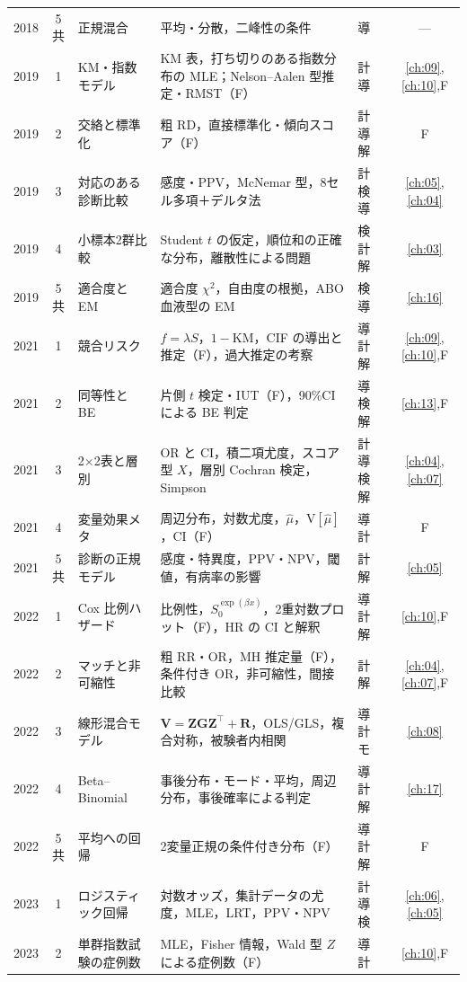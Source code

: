 \documentclass[a4paper,11pt,openany]{ltjsbook}
\newcommand{\V}{\mathrm{V}}
\newcommand{\transp}{^{\top}}
\begin{document}
\begin{center}
\begin{longtable}{@{}ccL{36mm}L{58mm}L{16mm}c@{}}
2018 & 5共 & 正規混合 & 平均・分散，二峰性の条件 & 導 & ---\\
2019 & 1 & KM・指数モデル & KM 表，打ち切りのある指数分布の MLE；Nelson--Aalen 型推定・RMST（F） & 計 導 & \ref{ch:09},\ref{ch:10},F\\
2019 & 2 & 交絡と標準化 & 粗 RD，直接標準化・傾向スコア（F） & 計 導 解 & F\\
2019 & 3 & 対応のある診断比較 & 感度・PPV，McNemar 型，8セル多項＋デルタ法 & 計 検 導 & \ref{ch:05},\ref{ch:04}\\
2019 & 4 & 小標本2群比較 & Student $t$ の仮定，順位和の正確な分布，離散性による問題 & 検 計 解 & \ref{ch:03}\\
2019 & 5共 & 適合度と EM & 適合度 $\chi^2$，自由度の根拠，ABO 血液型の EM & 検 導 & \ref{ch:16}\\
2021 & 1 & 競合リスク & $f=\lambda S$，$1-$KM，CIF の導出と推定（F），過大推定の考察 & 導 計 解 & \ref{ch:09},\ref{ch:10},F\\
2021 & 2 & 同等性と BE & 片側 $t$ 検定・IUT（F），90\%CI による BE 判定 & 導 検 解 & \ref{ch:13},F\\
2021 & 3 & 2×2表と層別 & OR と CI，積二項尤度，スコア型 $X$，層別 Cochran 検定，Simpson & 計 導 検 解 & \ref{ch:04},\ref{ch:07}\\
2021 & 4 & 変量効果メタ & 周辺分布，対数尤度，$\hat\mu$，$\V[\hat\mu]$，CI（F） & 導 計 & F\\
2021 & 5共 & 診断の正規モデル & 感度・特異度，PPV・NPV，閾値，有病率の影響 & 計 解 & \ref{ch:05}\\
2022 & 1 & Cox 比例ハザード & 比例性，$S_0^{\exp(\beta x)}$，2重対数プロット（F），HR の CI と解釈 & 導 計 解 & \ref{ch:10},F\\
2022 & 2 & マッチと非可縮性 & 粗 RR・OR，MH 推定量（F），条件付き OR，非可縮性，間接比較 & 計 解 & \ref{ch:04},\ref{ch:07},F\\
2022 & 3 & 線形混合モデル & $\bm V=\bm Z\bm G\bm Z\transp+\bm R$，OLS/GLS，複合対称，被験者内相関 & 導 計 モ & \ref{ch:08}\\
2022 & 4 & Beta--Binomial & 事後分布・モード・平均，周辺分布，事後確率による判定 & 導 計 解 & \ref{ch:17}\\
2022 & 5共 & 平均への回帰 & 2変量正規の条件付き分布（F） & 導 計 解 & F\\
2023 & 1 & ロジスティック回帰 & 対数オッズ，集計データの尤度，MLE，LRT，PPV・NPV & 計 導 検 & \ref{ch:06},\ref{ch:05}\\
2023 & 2 & 単群指数試験の症例数 & MLE，Fisher 情報，Wald 型 $Z$ による症例数（F） & 導 計 & \ref{ch:10},F\\

\end{longtable}
\end{center}
\end{document}

